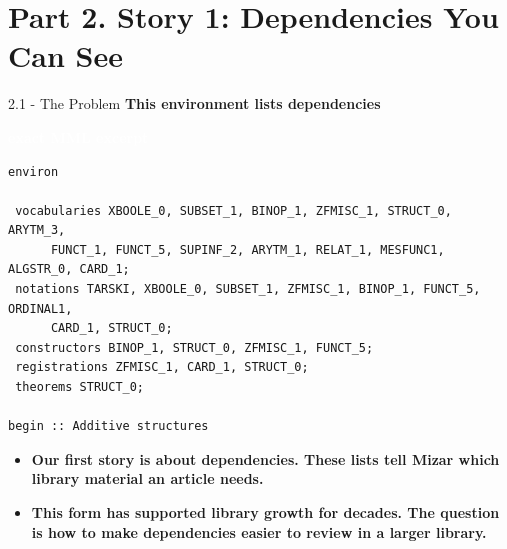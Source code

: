 \documentclass[aspectratio=169,11pt]{beamer}
\newcommand{\statusbadge}[2]{\colorbox{#1}{\textcolor{white}{\strut\scriptsize\sffamily\bfseries #2}}}
\newcommand{\badgeMML}{\statusbadge{blue!45!black}{exact MML excerpt}}
\begin{document}
\section{Part 2. Story 1: Dependencies You Can See}
\begin{frame}[fragile,t]{2.1 - The Problem}
\smallskip
\textbf{This environment lists dependencies}~\badgeMML
\begin{lstlisting}[language={mizar},basicstyle=\ttfamily\footnotesize]
environ

 vocabularies XBOOLE_0, SUBSET_1, BINOP_1, ZFMISC_1, STRUCT_0, ARYTM_3,
      FUNCT_1, FUNCT_5, SUPINF_2, ARYTM_1, RELAT_1, MESFUNC1, ALGSTR_0, CARD_1;
 notations TARSKI, XBOOLE_0, SUBSET_1, ZFMISC_1, BINOP_1, FUNCT_5, ORDINAL1,
      CARD_1, STRUCT_0;
 constructors BINOP_1, STRUCT_0, ZFMISC_1, FUNCT_5;
 registrations ZFMISC_1, CARD_1, STRUCT_0;
 theorems STRUCT_0;

begin :: Additive structures
\end{lstlisting}
\begin{itemize}
\setlength{\itemsep}{1pt}
\setlength{\parsep}{0pt}
\setlength{\parskip}{0pt}
\item \textcolor{blue!55!black}{\textbf{Our first story is about dependencies. These lists tell Mizar which library material an article needs.}}
\item \textcolor{blue!55!black}{\textbf{This form has supported library growth for decades. The question is how to make dependencies easier to review in a larger library.}}
\end{itemize}
\end{frame}
\end{document}
